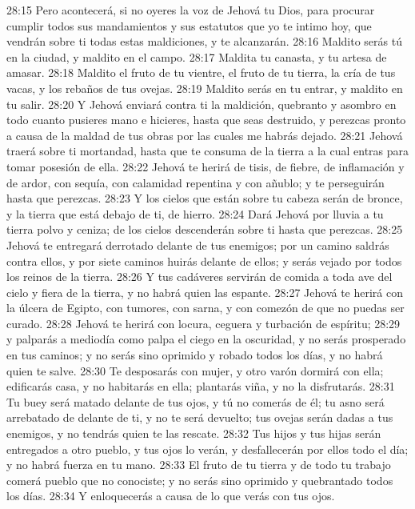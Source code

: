 28:15 Pero acontecerá, si no oyeres la voz de Jehová tu Dios, para procurar cumplir todos sus mandamientos y sus estatutos que yo te intimo hoy, que vendrán sobre ti todas estas maldiciones, y te alcanzarán.  
28:16 Maldito serás tú en la ciudad, y maldito en el campo.  
28:17 Maldita tu canasta, y tu artesa de amasar.  
28:18 Maldito el fruto de tu vientre, el fruto de tu tierra, la cría de tus vacas, y los rebaños de tus ovejas.  
28:19 Maldito serás en tu entrar, y maldito en tu salir.  
28:20 Y Jehová enviará contra ti la maldición, quebranto y asombro en todo cuanto pusieres mano e hicieres, hasta que seas destruido, y perezcas pronto a causa de la maldad de tus obras por las cuales me habrás dejado.  
28:21 Jehová traerá sobre ti mortandad, hasta que te consuma de la tierra a la cual entras para tomar posesión de ella.  
28:22 Jehová te herirá de tisis, de fiebre, de inflamación y de ardor, con sequía, con calamidad repentina y con añublo; y te perseguirán hasta que perezcas.  
28:23 Y los cielos que están sobre tu cabeza serán de bronce, y la tierra que está debajo de ti, de hierro.  
28:24 Dará Jehová por lluvia a tu tierra polvo y ceniza; de los cielos descenderán sobre ti hasta que perezcas.  
28:25 Jehová te entregará derrotado delante de tus enemigos; por un camino saldrás contra ellos, y por siete caminos huirás delante de ellos; y serás vejado por todos los reinos de la tierra.  
28:26 Y tus cadáveres servirán de comida a toda ave del cielo y fiera de la tierra, y no habrá quien las espante.  
28:27 Jehová te herirá con la úlcera de Egipto, con tumores, con sarna, y con comezón de que no puedas ser curado.  
28:28 Jehová te herirá con locura, ceguera y turbación de espíritu;  
28:29 y palparás a mediodía como palpa el ciego en la oscuridad, y no serás prosperado en tus caminos; y no serás sino oprimido y robado todos los días, y no habrá quien te salve.  
28:30 Te desposarás con mujer, y otro varón dormirá con ella; edificarás casa, y no habitarás en ella; plantarás viña, y no la disfrutarás.  
28:31 Tu buey será matado delante de tus ojos, y tú no comerás de él; tu asno será arrebatado de delante de ti, y no te será devuelto; tus ovejas serán dadas a tus enemigos, y no tendrás quien te las rescate.  
28:32 Tus hijos y tus hijas serán entregados a otro pueblo, y tus ojos lo verán, y desfallecerán por ellos todo el día; y no habrá fuerza en tu mano.  
28:33 El fruto de tu tierra y de todo tu trabajo comerá pueblo que no conociste; y no serás sino oprimido y quebrantado todos los días.  
28:34 Y enloquecerás a causa de lo que verás con tus ojos.  
